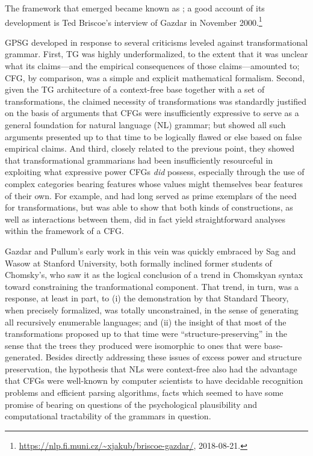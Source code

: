 \documentclass[output=paper
                ,modfonts
                ,nonflat
	        ,collection
	        ,collectionchapter
	        ,collectiontoclongg
 	        ,biblatex
                ,babelshorthands
                ,newtxmath
                ,draftmode
                ,colorlinks, citecolor=brown
]{./langsci/langscibook}
\begin{document}
\noindent
The framework that emerged became known as ; a good account of its development is Ted Briscoe's interview of Gazdar in November 2000.\footnote{\url{https://nlp.fi.muni.cz/~xjakub/briscoe-gazdar/}, 2018-08-21.}

GPSG developed in response to several criticisms leveled against transformational grammar. First, TG was highly underformalized, to the extent that it was unclear what its claims---and the empirical consequences of those claims---amounted to; CFG, by comparison, was a simple and explicit mathematical formalism. Second, given the TG architecture of a context-free base together with a set of transformations, the claimed necessity of transformations was standardly justified on the basis of arguments that CFGs were insufficiently expressive to serve as a general foundation for natural language (NL) grammar; but \citet{PG82a-u} showed all such arguments presented up to that time to be logically flawed or else based on false empirical claims. And third, closely related to the previous point, they showed that transformational grammarians had been insufficiently resourceful in exploiting what expressive power CFGs \emph{did} possess, especially through the use of complex categories bearing features whose values might themselves bear features of their own.  For example,  and  had long served as prime exemplars of the need for transformations, but \citet{Gazdar81a} was able to show that both kinds of constructions, as well as interactions between them, did in fact yield straightforward analyses within the framework of a CFG.
 
Gazdar and Pullum's early work in this vein was quickly embraced by Sag and Wasow at Stanford University, both formally inclined former students of Chomsky's, who saw it as the logical conclusion of a trend in Chomskyan syntax toward constraining the tranformational component. That trend, in turn, was a response, at least in part, to (i) the demonstration by \citet{PR73a-u} that  Standard Theory, when precisely formalized, was totally unconstrained, in the sense of generating all recursively enumerable languages; and (ii) the insight of \citet{Emonds76a-u} that most of the transformations proposed up to that time were ``structure-preserving'' in the sense that the trees they produced were isomorphic to ones that were base-generated. Besides directly addressing these issues of excess power and structure preservation, the hypothesis that NLs were context-free also had the advantage that CFGs were well-known by computer scientists to have decidable recognition problems and efficient parsing algorithms, facts which seemed to have some promise of bearing on questions of the psychological plausibility and computational tractability of the grammars in question.
\end{document}

